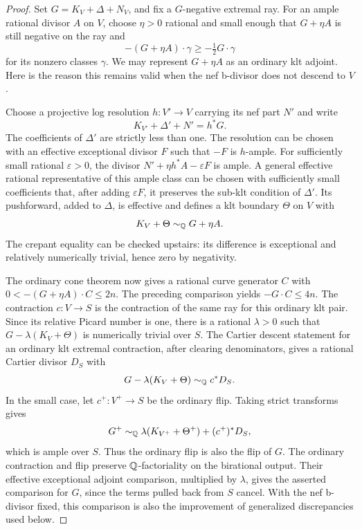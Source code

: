 \begin{proof}
Set $G=K_V+\Delta+N_V$, and fix a $G$-negative extremal ray.
For an ample rational divisor $A$ on $V$, choose $\eta>0$ rational and
small enough that $G+\eta A$ is still negative on the ray and
\[
                 -(G+\eta A)\cdot\gamma
                      \geq -\tfrac12G\cdot\gamma
\]
for its nonzero classes $\gamma$.  We may represent $G+\eta A$ as an
ordinary klt adjoint.  Here is the reason this remains valid when the
nef b-divisor does not descend to $V$.

Choose a projective log resolution $h\colon V'\to V$ carrying its nef
part $N'$ and write
\[
                  K_{V'}+\Delta'+N'=h^*G.
\]
The coefficients of $\Delta'$ are strictly less than one.  The
resolution can be chosen with an effective exceptional divisor $F$
such that $-F$ is $h$-ample.  For sufficiently small rational
$\varepsilon>0$, the divisor
$N'+\eta h^*A-\varepsilon F$ is ample.  A general effective rational
representative of this ample class can be chosen with sufficiently
small coefficients that, after adding $\varepsilon F$, it preserves
the sub-klt condition of $\Delta'$.  Its pushforward, added to
$\Delta$, is effective and defines a klt boundary $\Theta$ on $V$ with
\[
                       K_V+\Theta\sim_\mathbb Q G+\eta A.
\]
The crepant equality can be checked upstairs: its difference is
exceptional and relatively numerically trivial, hence zero by
negativity.

The ordinary cone theorem now gives a rational curve generator $C$
with $0<-(G+\eta A)\cdot C\leq2n$.  The preceding comparison yields
$-G\cdot C\leq4n$.  The contraction $c\colon V\to S$ is the
contraction of the same ray for this ordinary klt pair.  Since its
relative Picard number is one, there is a rational $\lambda>0$ such
that $G-\lambda(K_V+\Theta)$ is numerically trivial over $S$.
The Cartier descent statement for an ordinary klt extremal
contraction, after clearing denominators, gives a rational Cartier
divisor $D_S$ with
\[
                 G-\lambda(K_V+\Theta)\sim_\mathbb Q c^*D_S.
\]
In the small case, let $c^+\colon V^+\to S$ be the ordinary flip.
Taking strict transforms gives
\[
                 G^+\sim_\mathbb Q
                 \lambda(K_{V^+}+\Theta^+)+(c^+)^*D_S,
\]
which is ample over $S$.  Thus the ordinary flip is also the flip of
$G$.  The ordinary contraction and flip preserve $\mathbb Q$-factoriality
on the birational output.  Their effective exceptional adjoint
comparison, multiplied by $\lambda$, gives the asserted comparison
for $G$, since the terms pulled back from $S$ cancel.  With the nef
b-divisor fixed, this comparison is also the improvement of
generalized discrepancies used below.
\end{proof}

